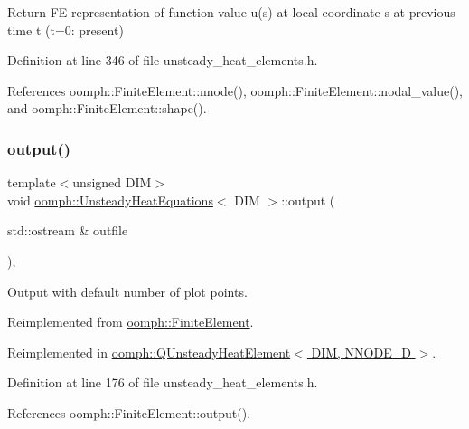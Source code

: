 Return FE representation of function value u(s) at local coordinate s at previous time t (t=0\+: present) 



Definition at line 346 of file unsteady\+\_\+heat\+\_\+elements.\+h.



References oomph\+::\+Finite\+Element\+::nnode(), oomph\+::\+Finite\+Element\+::nodal\+\_\+value(), and oomph\+::\+Finite\+Element\+::shape().

\mbox{\label{classoomph_1_1UnsteadyHeatEquations_a1d73897c7329f0b82f29542cb5c72fff}} 
\subsubsection{\texorpdfstring{output()}{output()}\hspace{0.1cm}{\footnotesize\ttfamily [1/4]}}
{\footnotesize\ttfamily template$<$unsigned D\+IM$>$ \\
void \hyperlink{classoomph_1_1UnsteadyHeatEquations}{oomph\+::\+Unsteady\+Heat\+Equations}$<$ D\+IM $>$\+::output (\begin{DoxyParamCaption}\item[{std\+::ostream \&}]{outfile }\end{DoxyParamCaption})\hspace{0.3cm}{\ttfamily [inline]}, {\ttfamily [virtual]}}



Output with default number of plot points. 



Reimplemented from \hyperlink{classoomph_1_1FiniteElement_a2ad98a3d2ef4999f1bef62c0ff13f2a7}{oomph\+::\+Finite\+Element}.



Reimplemented in \hyperlink{classoomph_1_1QUnsteadyHeatElement_a50c15ed85f1200ac8e81192cc4b5584f}{oomph\+::\+Q\+Unsteady\+Heat\+Element$<$ D\+I\+M, N\+N\+O\+D\+E\+\_\+D $>$}.



Definition at line 176 of file unsteady\+\_\+heat\+\_\+elements.\+h.



References oomph\+::\+Finite\+Element\+::output().



